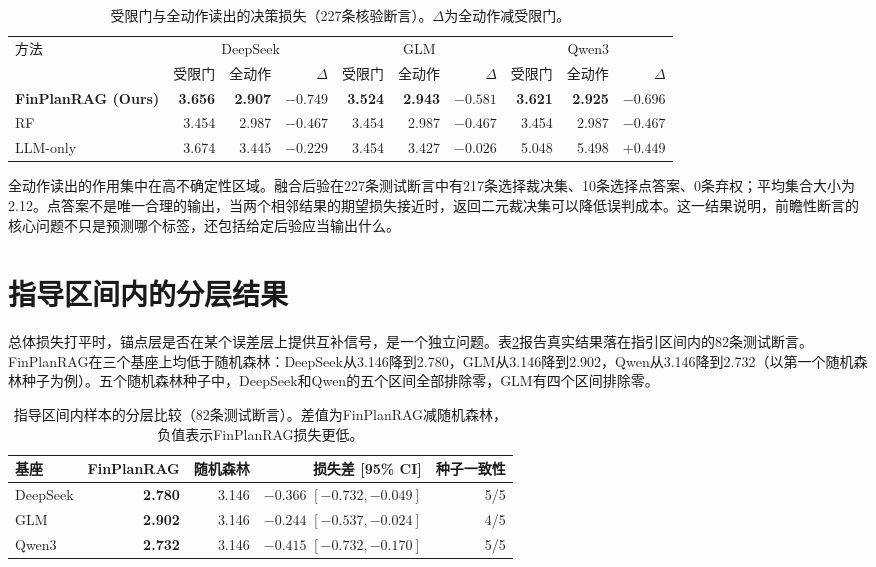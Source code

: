\begin{table}[htbp]
\centering
{}
\setlength{\tabcolsep}{2.5pt}
\caption{受限门与全动作读出的决策损失（227条核验断言）。$\Delta$为全动作减受限门。}
\label{tab:readout}
\begin{tabular}{lrrrrrrrrr}
\toprule
\multirow{2}{*}{方法} & \multicolumn{3}{c}{DeepSeek} & \multicolumn{3}{c}{GLM} & \multicolumn{3}{c}{Qwen3} \\
\cmidrule(lr){2-4}\cmidrule(lr){5-7}\cmidrule(lr){8-10}
 & 受限门 & 全动作 & $\Delta$ & 受限门 & 全动作 & $\Delta$ & 受限门 & 全动作 & $\Delta$ \\
\midrule
\textbf{FinPlanRAG (Ours)} & \textbf{3.656} & \textbf{2.907} & \textbf{$-0.749$} & \textbf{3.524} & \textbf{2.943} & \textbf{$-0.581$} & \textbf{3.621} & \textbf{2.925} & \textbf{$-0.696$} \\
RF & 3.454 & 2.987 & $-0.467$ & 3.454 & 2.987 & $-0.467$ & 3.454 & 2.987 & $-0.467$ \\
LLM-only & 3.674 & 3.445 & $-0.229$ & 3.454 & 3.427 & $-0.026$ & 5.048 & 5.498 & $+0.449$ \\
\bottomrule
\end{tabular}
\end{table}

全动作读出的作用集中在高不确定性区域。融合后验在227条测试断言中有217条选择裁决集、10条选择点答案、0条弃权；平均集合大小为2.12。点答案不是唯一合理的输出，当两个相邻结果的期望损失接近时，返回二元裁决集可以降低误判成本。这一结果说明，前瞻性断言的核心问题不只是预测哪个标签，还包括给定后验应当输出什么。

\section{指导区间内的分层结果}
\label{sec:within}

总体损失打平时，锚点层是否在某个误差层上提供互补信号，是一个独立问题。表\ref{tab:within}报告真实结果落在指引区间内的82条测试断言。FinPlanRAG在三个基座上均低于随机森林：DeepSeek从3.146降到2.780，GLM从3.146降到2.902，Qwen从3.146降到2.732（以第一个随机森林种子为例）。五个随机森林种子中，DeepSeek和Qwen的五个区间全部排除零，GLM有四个区间排除零。

\begin{table}[htbp]
\centering
{}
\setlength{\tabcolsep}{4pt}
\caption{指导区间内样本的分层比较（82条测试断言）。差值为FinPlanRAG减随机森林，负值表示FinPlanRAG损失更低。}
\label{tab:within}
\begin{tabular}{lrrrr}
\toprule
基座 & FinPlanRAG & 随机森林 & 损失差 [95\% CI] & 种子一致性 \\
\midrule
DeepSeek & \textbf{2.780} & 3.146 & $-0.366$ $[-0.732,-0.049]$ & 5/5 \\
GLM & \textbf{2.902} & 3.146 & $-0.244$ $[-0.537,-0.024]$ & 4/5 \\
Qwen3 & \textbf{2.732} & 3.146 & $-0.415$ $[-0.732,-0.170]$ & 5/5 \\
\bottomrule
\end{tabular}
\end{table}

